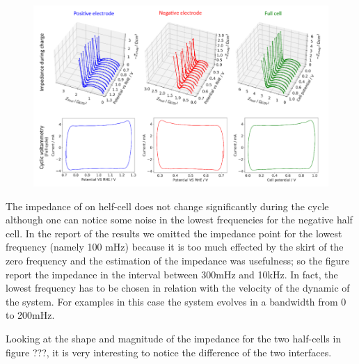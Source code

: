 \begin{figure}[h]
    \centering
    \includegraphics[width = \linewidth]{figures/image3.png}
\end{figure}

The impedance of on helf-cell does not change significantly during the cycle although one can notice some noise in the lowest frequencies for the negative half cell. In the report of the results we omitted the impedance point for the lowest frequency (namely 100 mHz) because it is too much effected by the skirt of the zero frequency and the estimation of the impedance was usefulness; so the figure report the impedance in the interval between 300mHz and 10kHz. In fact, the lowest frequency has to be chosen in relation with the velocity of the dynamic of the system. For examples in this case the system evolves in a bandwidth from 0 to 200mHz. 

Looking at the shape and magnitude of the impedance for the two half-cells in figure ???, it is very interesting to notice the difference of the two interfaces.

